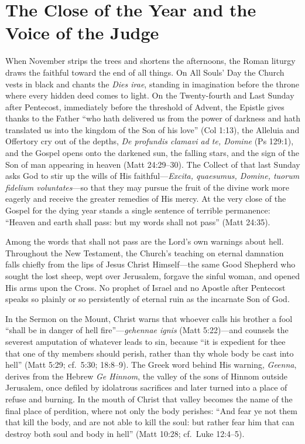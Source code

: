 \section{The Close of the Year and the Voice of the Judge}

When November strips the trees and shortens the afternoons, the Roman liturgy draws the faithful toward the end of all things. On All Souls' Day the Church vests in black and chants the \textit{Dies irae}, standing in imagination before the throne where every hidden deed comes to light. On the Twenty-fourth and Last Sunday after Pentecost, immediately before the threshold of Advent, the Epistle gives thanks to the Father ``who hath delivered us from the power of darkness and hath translated us into the kingdom of the Son of his love'' (Col 1:13), the Alleluia and Offertory cry out of the depths, \textit{De profundis clamavi ad te, Domine} (Ps 129:1), and the Gospel opens onto the darkened sun, the falling stars, and the sign of the Son of man appearing in heaven (Matt 24:29--30). The Collect of that last Sunday asks God to stir up the wills of His faithful---\textit{Excita, quaesumus, Domine, tuorum fidelium voluntates}---so that they may pursue the fruit of the divine work more eagerly and receive the greater remedies of His mercy. At the very close of the Gospel for the dying year stands a single sentence of terrible permanence: ``Heaven and earth shall pass: but my words shall not pass'' (Matt 24:35).

Among the words that shall not pass are the Lord's own warnings about hell. Throughout the New Testament, the Church's teaching on eternal damnation falls chiefly from the lips of Jesus Christ Himself---the same Good Shepherd who sought the lost sheep, wept over Jerusalem, forgave the sinful woman, and opened His arms upon the Cross. No prophet of Israel and no Apostle after Pentecost speaks so plainly or so persistently of eternal ruin as the incarnate Son of God.

In the Sermon on the Mount, Christ warns that whoever calls his brother a fool ``shall be in danger of hell fire''---\textit{gehennae ignis} (Matt 5:22)---and counsels the severest amputation of whatever leads to sin, because ``it is expedient for thee that one of thy members should perish, rather than thy whole body be cast into hell'' (Matt 5:29; cf.\ 5:30; 18:8--9). The Greek word behind His warning, \textit{Geenna}, derives from the Hebrew \textit{Ge Hinnom}, the valley of the sons of Hinnom outside Jerusalem, once defiled by idolatrous sacrifices and later turned into a place of refuse and burning. In the mouth of Christ that valley becomes the name of the final place of perdition, where not only the body perishes: ``And fear ye not them that kill the body, and are not able to kill the soul: but rather fear him that can destroy both soul and body in hell'' (Matt 10:28; cf.\ Luke 12:4--5).

